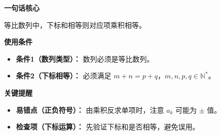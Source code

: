 \begin{summarybox}
\textbf{\textcolor{CSummary}{一句话核心}}

等比数列中，下标和相等则对应项乘积相等。

\medskip
\textbf{\textcolor{CSummary}{使用条件}}
\begin{itemize}[leftmargin=*, itemsep=0.5em, topsep=0.4em]
    \item \textbf{条件1（数列类型）：} 数列必须是等比数列。
    \item \textbf{条件2（下标相等）：} 必须满足 $m+n=p+q$，$m,n,p,q\in\mathbb{N}^*$。
\end{itemize}

\medskip
\textbf{\textcolor{CSummary}{关键提醒}}
\begin{itemize}[leftmargin=*, itemsep=0.5em, topsep=0.4em]
    \item \textbf{易错点（正负符号）：} 由乘积反求单项时，注意 $a_k$ 可能为 $\pm$ 值。
    \item \textbf{检查项（下标运算）：} 先验证下标和是否相等，避免误用。
\end{itemize}
\end{summarybox}
